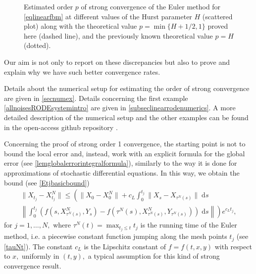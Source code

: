 \documentclass[reqno,12pt]{amsart}
\theoremstyle{plain} %
\theoremstyle{definition} %
\begin{document}
\begin{figure}[htb]
    \caption{Estimated order $p$ of strong convergence of the Euler method for \cref{eqlinearfbm} at different values of the Hurst parameter $H$ (scattered plot) along with the theoretical value $p=\min\{H + 1/2, 1\}$ proved here (dashed line), and the previously known theoretical value $p=H$ (dotted).}
    \label{figorderdepHfBmintro}
\end{figure}

Our aim is not only to report on these discrepancies but also to prove and explain why we have such better convergence rates. 

Details about the numerical setup for estimating the order of strong convergence are given in \cref{secnumex}. Details concerning the first example \cref{allnoisesRODEsystemintro} are given in \cref{subseclinearrodenumerics}. A more detailed description of the numerical setup and the other examples can be found in the open-access github repository \cite{RODEConvEM2023}.

Concerning the proof of strong order 1 convergence, the starting point is not to bound the local error and, instead, work with an explicit formula for the global error (see \cref{lemglobalerrorintegralformula}), similarly to the way it is done for approximations of stochastic differential equations. In this way, we obtain the bound (see \cref{Etjbasicbound})
\begin{multline}
    \label{Etjbasicboundintro}
        \|X_{t_j} - X_{t_j}^N\| \leq \left( \|X_0 - X_0^N\| + c_L \int_0^{t_j} \|X_s - X_{\tau^N(s)}\| \;\mathrm{d}s \right. \\
        \left. \left\|\int_0^{t_j} \left( f(s, X_{\tau^N(s)}^N, Y_s) - f(\tau^N(s), X_{\tau^N(s)}^N, Y_{\tau^N(s)}) \right)\;\mathrm{d}s\right\|\right) e^{c_L t_j},
\end{multline}
for $j = 1, \ldots, N,$ where $\tau^N(t) = \max_{t_j \leq t} t_j$ is the running time of the Euler method, i.e. a piecewise constant function jumping along the mesh points $t_j$ (see \cref{tauNt}). The constant $c_L$ is the Lipschitz constant of $f=f(t, x, y)$ with respect to $x,$ uniformly in $(t, y),$ a typical assumption for this kind of strong convergence result.
\end{document}
